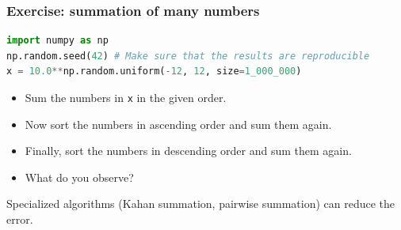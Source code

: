 \begin{frame}[fragile]
  \frametitle{Exercise: summation of many numbers}

  \begin{lstlisting}[language=Python]
import numpy as np
np.random.seed(42) # Make sure that the results are reproducible
x = 10.0**np.random.uniform(-12, 12, size=1_000_000)
  \end{lstlisting}

\begin{itemize}
  \item Sum the numbers in \lstinline|x| in the given order.
  \item Now sort the numbers in ascending order and sum them again.
  \item Finally, sort the numbers in descending order and sum them again.
  \item What do you observe?
\end{itemize}  
\pause
Specialized algorithms (Kahan summation, pairwise summation) can reduce the error.
\end{frame}


